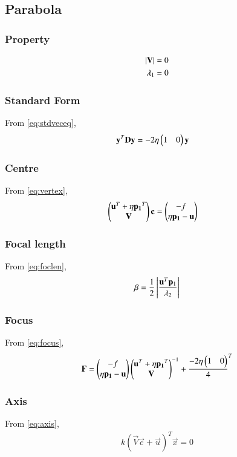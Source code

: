 \documentclass[journal,12pt,twocolumn]{IEEEtran}
\begin{document}
\subsection{Parabola}
\subsubsection{Property}
\begin{align}
    \left\vert\mathbf{V}\right\vert = 0
    \\
    \lambda_1=0
\end{align}
\subsubsection{Standard Form}
From \eqref{eq:stdveceq},
\begin{align}
    \mathbf{y}^T\mathbf{D}\mathbf{y} &= -2\eta\begin{pmatrix}1 & 0\end{pmatrix}\mathbf{y} 
\end{align}
\subsubsection{Centre}
From \eqref{eq:vertex},
\begin{align}
    \begin{pmatrix}\mathbf{u}^T + \eta\mathbf{p_1}^T \\ \mathbf{V}\end{pmatrix}\mathbf{c} &= \begin{pmatrix}-f \\ \eta\mathbf{p_1} - \mathbf{u}\end{pmatrix} 
\end{align}
\subsubsection{Focal length}
From \eqref{eq:foclen},
\begin{align}
\beta = \frac{1}{2}\left\vert\frac{\mathbf{u}^T\mathbf{p}_1}{\lambda_2}\right\vert 
\end{align}
\subsubsection{Focus}
From \eqref{eq:focus},
\begin{align}
\mathbf{F} = \begin{pmatrix}-f \\ \eta\mathbf{p_1} - \mathbf{u}\end{pmatrix}{\ensuremath{\begin{pmatrix}\mathbf{u}^T + \eta\mathbf{p_1}^T \\ \mathbf{V}\end{pmatrix}}}^{-1} + {\frac{-2\eta\begin{pmatrix}1 & 0\end{pmatrix}}{4}}^{T} 
\end{align}
\subsubsection{Axis}
From \eqref{eq:axis},
\begin{align}
    k(\vec{V}\vec{c}+\vec{u})^{T}\vec{x} = 0 
\end{align}
\end{document}
